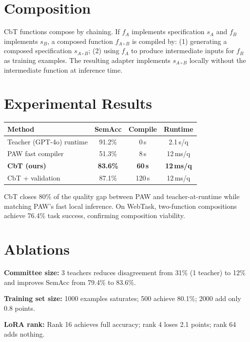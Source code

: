 \documentclass[10pt,twocolumn]{article}
\begin{document}
\section{Composition}

CbT functions compose by chaining. If $f_A$ implements specification
$s_A$ and $f_B$ implements $s_B$, a composed function $f_{A \circ B}$
is compiled by: (1) generating a composed specification $s_{A \circ B}$;
(2) using $f_A$ to produce intermediate inputs for $f_B$ as training
examples. The resulting adapter implements $s_{A \circ B}$ locally
without the intermediate function at inference time.

\section{Experimental Results}

\begin{center}
\begin{tabular}{lccc}
\toprule
Method & SemAcc & Compile & Runtime \\
\midrule
Teacher (GPT-4o) runtime & 91.2\% & 0\,s & 2.1\,s/q \\
PAW fast compiler        & 51.3\% & 8\,s & 12\,ms/q \\
\textbf{CbT (ours)}      & \textbf{83.6\%} & \textbf{60\,s} & \textbf{12\,ms/q} \\
CbT + validation         & 87.1\% & 120\,s & 12\,ms/q \\
\bottomrule
\end{tabular}
\end{center}

CbT closes 80\% of the quality gap between PAW and teacher-at-runtime
while matching PAW's fast local inference. On WebTask, two-function
compositions achieve 76.4\% task success, confirming composition viability.

\section{Ablations}

\textbf{Committee size:} 3 teachers reduces disagreement from 31\%
(1 teacher) to 12\% and improves SemAcc from 79.4\% to 83.6\%.

\textbf{Training set size:} 1000 examples saturates; 500 achieve 80.1\%;
2000 add only 0.8 points.

\textbf{LoRA rank:} Rank 16 achieves full accuracy; rank 4 loses 2.1
points; rank 64 adds nothing.
\end{document}

